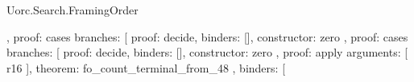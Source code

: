 \begin{lexlean}{Uorc.Search.FramingOrder}
\begin{semanticmodule}
{{{{{{{{{{{{{{{{{{{{{{{{{{{{{                                                                                    },
                                                                                    {
                                                                                      proof: cases{
                                                                                        branches: [
                                                                                          {
                                                                                            proof: decide{},
                                                                                            binders: [],
                                                                                            constructor: zero
                                                                                          },
                                                                                          {
                                                                                            proof: cases{
                                                                                              branches: [
                                                                                                {
                                                                                                  proof: decide{},
                                                                                                  binders: [],
                                                                                                  constructor: zero
                                                                                                },
                                                                                                {
                                                                                                  proof: apply{
                                                                                                    arguments: [
                                                                                                      r16
                                                                                                    ],
                                                                                                    theorem: fo_count_terminal_from_48
                                                                                                  },
                                                                                                  binders: [
}}}}}}}}}}}}}}}}}}}}}}}}}}}}}}}}}
\end{semanticmodule}
\end{lexlean}
